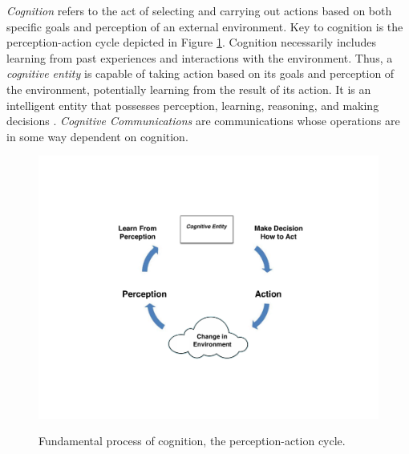 \documentclass[conference]{IEEEtran}
\begin{document}
\textit{Cognition} refers to the act of selecting and carrying out actions based on both specific {\color{black} goals and perception of an external environment}.  Key to cognition is the perception-action cycle depicted in Figure \ref{fig:figure1}.  Cognition necessarily includes learning from past experiences and {\color{black} interactions with the environment}.  Thus, a \textit{cognitive entity} is capable of taking action based on its {\color{black} goals and perception of the environment}, potentially learning from the result of its action.  It is an intelligent entity that possesses perception, learning, reasoning, and making decisions \cite{ref7}. \textit{Cognitive Communications} are communications whose operations are in some way dependent on cognition.

\begin{figure}[t!]
  \begin{center}
    \includegraphics[width=0.8\linewidth] {images/Figure1.pdf} \\
  \end{center}
  \caption{Fundamental process of cognition, the perception-action cycle.}
  \label{fig:figure1}
\end{figure}

\end{document}
